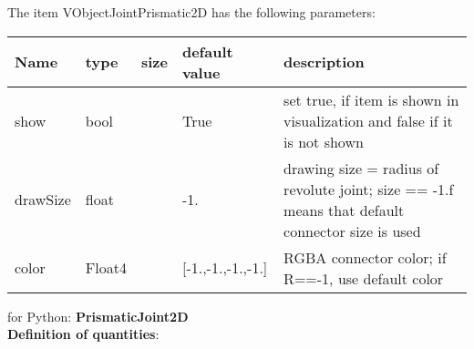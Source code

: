 The item VObjectJointPrismatic2D has the following parameters:\vspace{-1cm}\\ 
\begin{center}
  \footnotesize
  \begin{longtable}{| p{4.5cm} | p{2.5cm} | p{0.5cm} | p{2.5cm} | p{6cm} |}
    \hline
    \bf Name & \bf type & \bf size & \bf default value & \bf description \\ \hline
    show &     bool &      &     True &     set true, if item is shown in visualization and false if it is not shown\\ \hline
    drawSize &     float &      &     -1. &     drawing size = radius of revolute joint; size == -1.f means that default connector size is used\\ \hline
    color &     Float4 &      &     [-1.,-1.,-1.,-1.] &     RGBA connector color; if R==-1, use default color\\ \hline
	  \end{longtable}
	\end{center}

 for Python: {\bf PrismaticJoint2D}
 \vspace{6pt}\\{\bf Definition of quantities}:\\
\newpage

